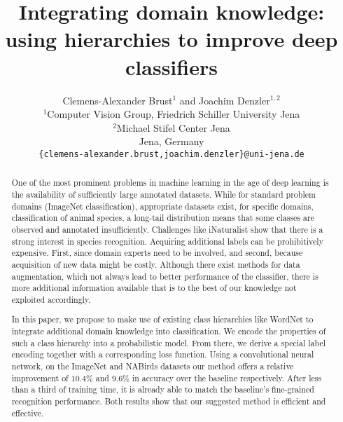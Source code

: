 \documentclass[10pt,twocolumn,letterpaper]{article}
\begin{document}
\title{\vspace{-24pt}Integrating domain knowledge:\\using hierarchies to improve deep classifiers}

\author{Clemens-Alexander Brust$^1$ and Joachim Denzler$^{1,2}$\\
$^1$Computer Vision Group, Friedrich Schiller University Jena\\
$^2$Michael Stifel Center Jena\\
Jena, Germany\\
{\tt\small \{clemens-alexander.brust,joachim.denzler\}@uni-jena.de}
}
\maketitle



\begin{abstract}
One of the most prominent problems in machine learning in the age of deep learning is the availability of sufficiently large annotated datasets. While for standard problem domains (ImageNet classification), appropriate datasets exist, for specific domains, \eg classification of animal species, a long-tail distribution means that some classes are observed and annotated insufficiently. Challenges like iNaturalist show that there is a strong interest in species recognition. Acquiring additional labels can be prohibitively expensive. First, since domain experts need to be involved, and second, because acquisition of new data might be costly. Although there exist methods for data augmentation, which not always lead to better performance of the classifier, there is more additional information available that is to the best of our knowledge not exploited accordingly. 

In this paper, we propose to make use of existing class hierarchies like WordNet to integrate additional domain knowledge into classification. We encode the properties of such a class hierarchy into a probabilistic model. From there, we derive a special label encoding together with a corresponding loss function. Using a convolutional neural network, on the ImageNet and NABirds datasets our method offers a relative improvement of $10.4\%$ and $9.6\%$ in accuracy over the baseline respectively. After less than a third of training time, it is already able to match the baseline's fine-grained recognition performance. Both results show that our suggested method is efficient and effective.
\end{abstract}
\end{document}
